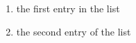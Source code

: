 \documentclass[a4paper]{article}
\begin{document}


\begin{enumerate}
	\item the first entry in the list
	\item the second entry of the list
\end{enumerate}
\end{document}
